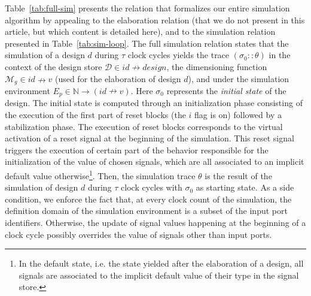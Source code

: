 Table~\ref{tab:full-sim} presents the relation that formalizes our
entire simulation algorithm by appealing to the elaboration relation
(that we do not present in this article, but which content is detailed
here\cite{Iampietro2021}), and to the simulation relation presented in
Table~\ref{tab:sim-loop}. The full simulation relation states that the
simulation of a design $d$ during $\tau$ clock cycles yields the trace
$(\sigma_0::\theta)$ in the context of the design store
$\mathcal{D}\in{}id\nrightarrow{}design$, the dimensioning function
$\mathcal{M}_g\in{}id\nrightarrow{}v$ (used for the elaboration of
design $d$), and under the simulation environment
$E_p\in\mathbb{N}\rightarrow(id\nrightarrow{}v)$. Here $\sigma_0$
represents the \textit{initial state} of the design. The initial state
is computed through an initialization phase consisting of the
execution of the first part of reset blocks (the $i$ flag is on)
followed by a stabilization phase. The execution of reset blocks
corresponds to the virtual activation of a reset signal at the
beginning of the simulation. This reset signal triggers the execution
of certain part of the behavior responsible for the initialization of
the value of chosen signals, which are all associated to an implicit
default value otherwise\footnote{In the default state, i.e. the state
  yielded after the elaboration of a design, all signals are
  associated to the implicit default value of their type in the signal
  store. }. Then, the simulation trace $\theta$ is the result of the
simulation of design $d$ during $\tau$ clock cycles with $\sigma_0$ as
starting state. As a side condition, we enforce the fact that, at
every clock count of the simulation, the definition domain of the
simulation environment is a subset of the input port
identifiers. Otherwise, the update of signal values happening at the
beginning of a clock cycle possibly overrides the value of signals
other than input ports.



